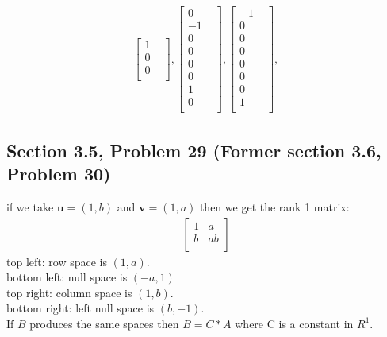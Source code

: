 \documentclass[a4paper,11pt]{article}
\newcommand{\mybf}[1]{\boldsymbol{#1}}
\begin{document}
\begin{enumerate}
\begin{align*}
\begin{bmatrix}
1 & \\
0 & \\
0 & \\
\end{bmatrix},
\begin{bmatrix}
0 &  \\
-1  \\
0 & \\
0 & \\
0 & \\
0 & \\
1 & \\
0 & \\
\end{bmatrix},
\begin{bmatrix}
-1 &  \\
0 &  \\
0 & \\
0 & \\
0 & \\
0 & \\
0 & \\
1 & \\
\end{bmatrix},
\end{align*}
\end{enumerate}
\subsection*{Section 3.5, Problem 29  (Former section 3.6, Problem 30)}
if we take $\mybf{u}=(1,b)$ and $\mybf{v}=(1,a)$ then we get the rank 1 matrix:
\begin{align*}
\begin{bmatrix}
1 & a  \\
b & ab \\
\end{bmatrix}
\end{align*}
top left: row space is $(1,a)$.\\
bottom left: null space is $(-a,1)$\\
top right: column space is $(1,b)$.\\
bottom right: left null space is $(b,-1)$.\\
If $B$ produces the same spaces then $B=C*A$ where C is a constant in $R^1$.
\end{document}
